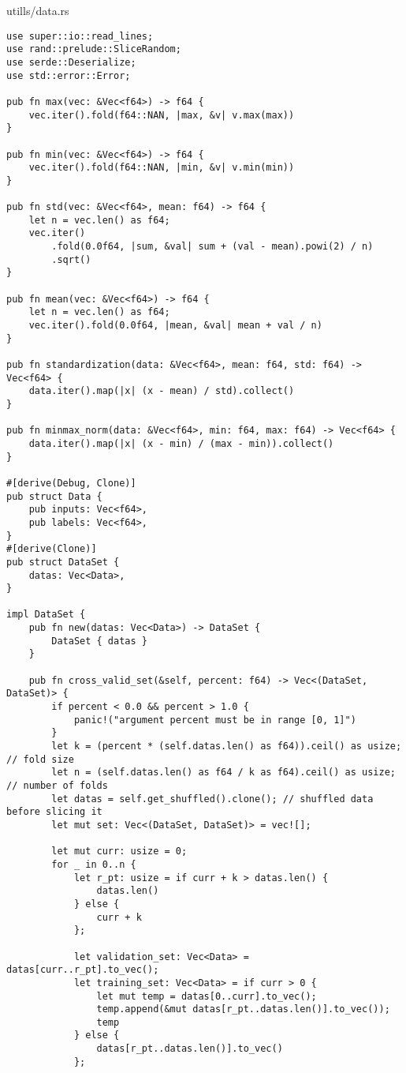 \begin{code}
\caption{utills/data.rs}
\begin{verbatim}  
use super::io::read_lines;
use rand::prelude::SliceRandom;
use serde::Deserialize;
use std::error::Error;

pub fn max(vec: &Vec<f64>) -> f64 {
    vec.iter().fold(f64::NAN, |max, &v| v.max(max))
}

pub fn min(vec: &Vec<f64>) -> f64 {
    vec.iter().fold(f64::NAN, |min, &v| v.min(min))
}

pub fn std(vec: &Vec<f64>, mean: f64) -> f64 {
    let n = vec.len() as f64;
    vec.iter()
        .fold(0.0f64, |sum, &val| sum + (val - mean).powi(2) / n)
        .sqrt()
}

pub fn mean(vec: &Vec<f64>) -> f64 {
    let n = vec.len() as f64;
    vec.iter().fold(0.0f64, |mean, &val| mean + val / n)
}

pub fn standardization(data: &Vec<f64>, mean: f64, std: f64) -> Vec<f64> {
    data.iter().map(|x| (x - mean) / std).collect()
}

pub fn minmax_norm(data: &Vec<f64>, min: f64, max: f64) -> Vec<f64> {
    data.iter().map(|x| (x - min) / (max - min)).collect()
}

#[derive(Debug, Clone)]
pub struct Data {
    pub inputs: Vec<f64>,
    pub labels: Vec<f64>,
}
#[derive(Clone)]
pub struct DataSet {
    datas: Vec<Data>,
}

impl DataSet {
    pub fn new(datas: Vec<Data>) -> DataSet {
        DataSet { datas }
    }

    pub fn cross_valid_set(&self, percent: f64) -> Vec<(DataSet, DataSet)> {
        if percent < 0.0 && percent > 1.0 {
            panic!("argument percent must be in range [0, 1]")
        }
        let k = (percent * (self.datas.len() as f64)).ceil() as usize; // fold size
        let n = (self.datas.len() as f64 / k as f64).ceil() as usize; // number of folds
        let datas = self.get_shuffled().clone(); // shuffled data before slicing it
        let mut set: Vec<(DataSet, DataSet)> = vec![];

        let mut curr: usize = 0;
        for _ in 0..n {
            let r_pt: usize = if curr + k > datas.len() {
                datas.len()
            } else {
                curr + k
            };

            let validation_set: Vec<Data> = datas[curr..r_pt].to_vec();
            let training_set: Vec<Data> = if curr > 0 {
                let mut temp = datas[0..curr].to_vec();
                temp.append(&mut datas[r_pt..datas.len()].to_vec());
                temp
            } else {
                datas[r_pt..datas.len()].to_vec()
            };


\end{verbatim}
\end{code}
